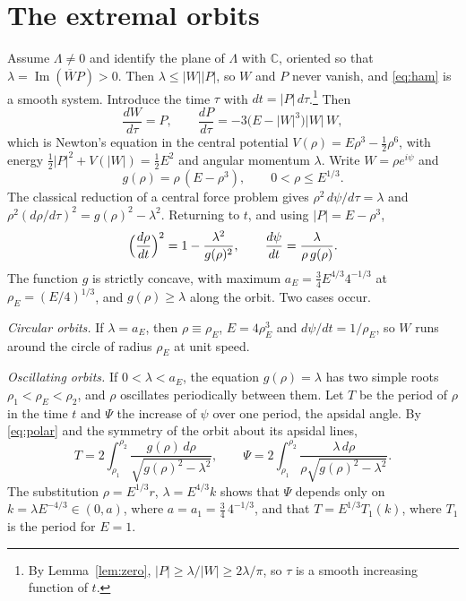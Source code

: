 \documentclass[11pt]{amsart}
\theoremstyle{definition}
\theoremstyle{remark}
\begin{document}
\section{The extremal orbits}\label{sec:orbits}

Assume $\Lambda\neq0$ and identify the plane of $\Lambda$ with $\mathbb C$, oriented so that $\lambda=\operatorname{Im}(\overline W P)>0$. Then $\lambda\le|W||P|$, so $W$ and $P$ never vanish, and \eqref{eq:ham} is a smooth system. Introduce the time $\tau$ with $dt=|P|\,d\tau$.\footnote{By Lemma~\ref{lem:zero}, $|P|\ge\lambda/|W|\ge2\lambda/\pi$, so $\tau$ is a smooth increasing function of $t$.} Then
\[
\frac{dW}{d\tau}=P,\qquad \frac{dP}{d\tau}=-3\bigl(E-|W|^3\bigr)|W|\,W ,
\]
which is Newton's equation in the central potential $V(\rho)=E\rho^3-\tfrac12\rho^6$, with energy $\frac12|P|^2+V(|W|)=\frac12E^2$ and angular momentum $\lambda$. Write $W=\rho e^{i\psi}$ and
\[
g(\rho)=\rho\,(E-\rho^3),\qquad 0<\rho\le E^{1/3}.
\]
The classical reduction of a central force problem \cite[\S8]{Arn89} gives $\rho^2\,d\psi/d\tau=\lambda$ and $\rho^2(d\rho/d\tau)^2=g(\rho)^2-\lambda^2$. Returning to $t$, and using $|P|=E-\rho^3$,
\begin{equation}\label{eq:polar}
\Bigl(\frac{d\rho}{dt}\Bigr)^2=1-\frac{\lambda^2}{g(\rho)^2},\qquad \frac{d\psi}{dt}=\frac{\lambda}{\rho\,g(\rho)} .
\end{equation}
The function $g$ is strictly concave, with maximum $a_E=\frac34E^{4/3}4^{-1/3}$ at $\rho_E=(E/4)^{1/3}$, and $g(\rho)\ge\lambda$ along the orbit. Two cases occur.

\emph{Circular orbits.} If $\lambda=a_E$, then $\rho\equiv\rho_E$, $E=4\rho_E^3$ and $d\psi/dt=1/\rho_E$, so $W$ runs around the circle of radius $\rho_E$ at unit speed.

\emph{Oscillating orbits.} If $0<\lambda<a_E$, the equation $g(\rho)=\lambda$ has two simple roots $\rho_1<\rho_E<\rho_2$, and $\rho$ oscillates periodically between them. Let $T$ be the period of $\rho$ in the time $t$ and $\Psi$ the increase of $\psi$ over one period, the apsidal angle. By \eqref{eq:polar} and the symmetry of the orbit about its apsidal lines,
\begin{equation}\label{eq:TPsi}
T=2\int_{\rho_1}^{\rho_2}\frac{g(\rho)\,d\rho}{\sqrt{g(\rho)^2-\lambda^2}},\qquad
\Psi=2\int_{\rho_1}^{\rho_2}\frac{\lambda\,d\rho}{\rho\sqrt{g(\rho)^2-\lambda^2}} .
\end{equation}
The substitution $\rho=E^{1/3}r$, $\lambda=E^{4/3}k$ shows that $\Psi$ depends only on $k=\lambda E^{-4/3}\in(0,a)$, where $a=a_1=\frac34\,4^{-1/3}$, and that $T=E^{1/3}T_1(k)$, where $T_1$ is the period for $E=1$.
\end{document}
